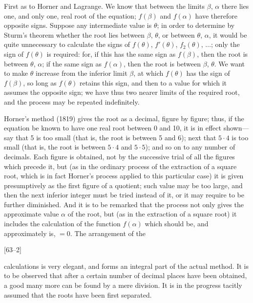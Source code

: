 \documentclass[12pt,a4paper,oneside]{book}
\newcommand{\paperref}[1]{\par\noindent\hfill[#1]\hfill\null\par}
\begin{document}
First as to Horner and Lagrange. We know that between the limits $\beta$, $\alpha$ there lies one, and only one, real root of the equation; $f(\beta)$ and $f(\alpha)$ have therefore opposite signs. Suppose any intermediate value is $\theta$; in order to determine by Sturm's theorem whether the root lies between $\beta$, $\theta$, or between $\theta$, $\alpha$, it would be quite unnecessary to calculate the signs of $f(\theta)$, $f'(\theta)$, $f_{2}(\theta)$, $\dots$; only the sign of $f(\theta)$ is required: for, if this has the same sign as $f(\beta)$, then the root is between $\theta$, $\alpha$; if the same sign as $f(\alpha)$, then the root is between $\beta$, $\theta$. We want to make $\theta$ increase from the inferior limit $\beta$, at which $f(\theta)$ has the sign of $f(\beta)$, so long as $f(\theta)$ retains this sign, and then to a value for which it assumes the opposite sign; we have thus two nearer limits of the required root, and the process may be repeated indefinitely.

Horner's method (1819) gives the root as a decimal, figure by figure; thus, if the equation be known to have one real root between 0 and 10, it is in effect shown---say that 5 is too small (that is, the root is between 5 and 6); next that $5\cdot 4$ is too small (that is, the root is between $5\cdot 4$ and $5\cdot 5$); and so on to any number of decimals. Each figure is obtained, not by the successive trial of all the figures which precede it, but (as in the ordinary process of the extraction of a square root, which is in fact Horner's process applied to this particular case) it is given presumptively as the first figure of a quotient; such value may be too large, and then the next inferior integer must be tried instead of it, or it may require to be further diminished. And it is to be remarked that the process not only gives the approximate value $\alpha$ of the root, but (as in the extraction of a square root) it includes the calculation of the function $f(\alpha)$ which should be, and approximately is, $=0$. The arrangement of the

\paperref{63--2}
\newpage
calculations is very elegant, and forms an integral part of the actual method. It is to be observed that after a certain number of decimal places have been obtained, a good many more can be found by a mere division. It is in the progress tacitly assumed that the roots have been first separated.
\end{document}
